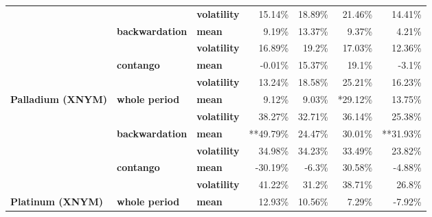 \documentclass[
  authoryear,
  preprint,
  3p]{elsarticle}
\begin{document}
\begin{longtable}[t]{>{}l>{}l>{}l>{}r>{}r>{}r>{}r}
\textbf{} & \textbf{} & \textbf{volatility} & \textcolor[HTML]{4285f4}{15.14\%} & \textcolor[HTML]{4285f4}{18.89\%} & \textcolor[HTML]{4285f4}{21.46\%} & \textcolor[HTML]{4285f4}{14.41\%}\\
\textbf{} & \textbf{backwardation} & \textbf{mean} & \textcolor[HTML]{4285f4}{9.19\%} & \textcolor[HTML]{4285f4}{13.37\%} & \textcolor[HTML]{4285f4}{9.37\%} & \textcolor[HTML]{4285f4}{4.21\%}\\
\textbf{} & \textbf{} & \textbf{volatility} & \textcolor[HTML]{4285f4}{16.89\%} & \textcolor[HTML]{4285f4}{19.2\%} & \textcolor[HTML]{4285f4}{17.03\%} & \textcolor[HTML]{4285f4}{12.36\%}\\
\textbf{} & \textbf{contango} & \textbf{mean} & \textcolor[HTML]{4285f4}{-0.01\%} & \textcolor[HTML]{4285f4}{15.37\%} & \textcolor[HTML]{4285f4}{19.1\%} & \textcolor[HTML]{4285f4}{-3.1\%}\\
\addlinespace
\textbf{} & \textbf{} & \textbf{volatility} & \textcolor[HTML]{4285f4}{13.24\%} & \textcolor[HTML]{4285f4}{18.58\%} & \textcolor[HTML]{4285f4}{25.21\%} & \textcolor[HTML]{4285f4}{16.23\%}\\
\textbf{Palladium (XNYM)} & \textbf{whole period} & \textbf{mean} & \textcolor[HTML]{4285f4}{9.12\%} & \textcolor[HTML]{4285f4}{9.03\%} & \textcolor[HTML]{4285f4}{*29.12\%} & \textcolor[HTML]{4285f4}{13.75\%}\\
\textbf{} & \textbf{} & \textbf{volatility} & \textcolor[HTML]{4285f4}{38.27\%} & \textcolor[HTML]{4285f4}{32.71\%} & \textcolor[HTML]{4285f4}{36.14\%} & \textcolor[HTML]{4285f4}{25.38\%}\\
\textbf{} & \textbf{backwardation} & \textbf{mean} & \textcolor[HTML]{4285f4}{**49.79\%} & \textcolor[HTML]{4285f4}{24.47\%} & \textcolor[HTML]{4285f4}{30.01\%} & \textcolor[HTML]{4285f4}{**31.93\%}\\
\textbf{} & \textbf{} & \textbf{volatility} & \textcolor[HTML]{4285f4}{34.98\%} & \textcolor[HTML]{4285f4}{34.23\%} & \textcolor[HTML]{4285f4}{33.49\%} & \textcolor[HTML]{4285f4}{23.82\%}\\
\addlinespace
\textbf{} & \textbf{contango} & \textbf{mean} & \textcolor[HTML]{4285f4}{-30.19\%} & \textcolor[HTML]{4285f4}{-6.3\%} & \textcolor[HTML]{4285f4}{30.58\%} & \textcolor[HTML]{4285f4}{-4.88\%}\\
\textbf{} & \textbf{} & \textbf{volatility} & \textcolor[HTML]{4285f4}{41.22\%} & \textcolor[HTML]{4285f4}{31.2\%} & \textcolor[HTML]{4285f4}{38.71\%} & \textcolor[HTML]{4285f4}{26.8\%}\\
\textbf{Platinum (XNYM)} & \textbf{whole period} & \textbf{mean} & \textcolor[HTML]{4285f4}{12.93\%} & \textcolor[HTML]{4285f4}{10.56\%} & \textcolor[HTML]{4285f4}{7.29\%} & \textcolor[HTML]{4285f4}{-7.92\%}\\

\end{longtable}
\end{document}
